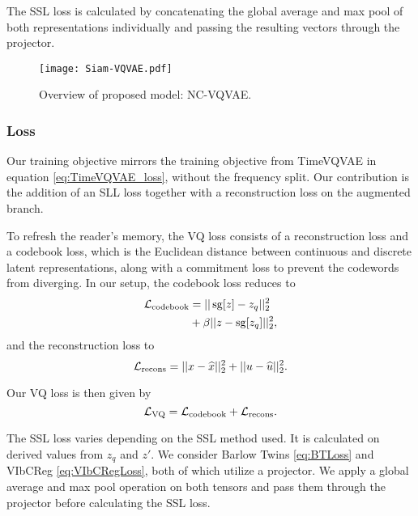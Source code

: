 \documentclass[../../thesis.tex]{subfiles}
\begin{document}
The SSL loss is calculated by concatenating the global average and max pool of both representations individually and passing the resulting vectors through the projector.\newline

\begin{figure}[h]
    \texttt{[image: Siam-VQVAE.pdf]}
    \centering  
    \caption{Overview of proposed model: NC-VQVAE.}
    \label{fig:NCVQVAE}
\end{figure}

\subsubsection{Loss}
Our training objective mirrors the training objective from TimeVQVAE in equation \ref{eq:TimeVQVAE_loss}, without the frequency split. Our contribution is the addition of an SLL loss together with a reconstruction loss on the augmented branch.\newline

To refresh the reader's memory, the VQ loss consists of a reconstruction loss and a codebook loss, which is the Euclidean distance between continuous and discrete latent representations, along with a commitment loss to prevent the codewords from diverging. In our setup, the codebook loss reduces to
\begin{equation}
    \label{eq:NCVQVAE_codebook}
    \begin{aligned}
        \mathcal{L}_\text{codebook} &= ||\operatorname{sg}[z] - z_q ||_2^2 \\
                              &+ \beta||z - \operatorname{sg}[z_q]||_2^2,
    \end{aligned}
\end{equation}
and the reconstruction loss to
\begin{equation}
    \label{eq:NCVQVAE_recons}
        \mathcal{L}_\text{recons} = ||x - \widehat{x} ||_2^2 + ||u - \widehat{u}||_2^2.
\end{equation}

Our VQ loss is then given by
\begin{equation}
    \label{eq:NCVQVAE_loss}
    \mathcal{L}_\text{VQ} = \mathcal{L}_\text{codebook} + \mathcal{L}_\text{recons}.
\end{equation}

The SSL loss varies depending on the SSL method used. It is calculated on derived values from $z_q$ and $z'$. We consider Barlow Twins \ref{eq:BTLoss} and VIbCReg \ref{eq:VIbCRegLoss}, both of which utilize a projector. We apply a global average and max pool operation on both tensors and pass them through the projector before calculating the SSL loss.\newline
\end{document}
